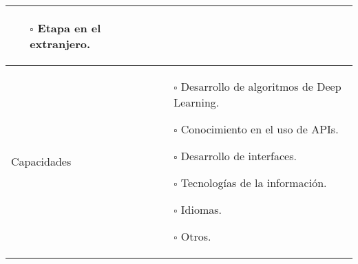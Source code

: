 \begin{table}[H]
\begin{center}
\begin{tabular}{|p{4cm}|p{10cm}|}
{\begin{itemize}
					\item[$\square$] Etapa en el extranjero.
			\end{itemize} } \\ \hline
		Capacidades & \parbox[l][0.4\textwidth][c]{8cm}{
			\begin{itemize}
				\item[$\square$] Desarrollo de algoritmos de Deep Learning.
				\item[$\square$] Conocimiento en el uso de APIs.
				\item[$\square$] Desarrollo de interfaces.
				\item[$\square$] Tecnologías de la información.
				\item[$\square$] Idiomas.
				\item[$\square$] Otros.
		\end{itemize} } \\ \hline
		\end{tabular}
	\end{center}
\end{table}
\newpage
